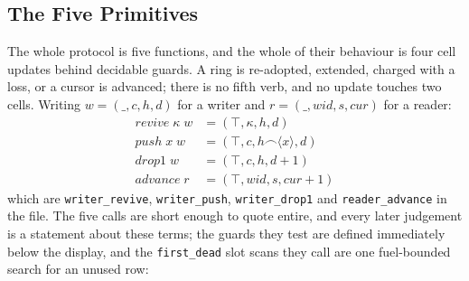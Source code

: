 \documentclass[10pt,journal,compsoc,twocolumn]{article}
\theoremstyle{definition}
\theoremstyle{remark}
\theoremstyle{plain}
\newcommand{\ctr}[1]{\texttt{#1}}
\begin{document}
\subsection{The Five Primitives}
\label{sec:primitives}
The whole protocol is five functions, and the whole of their behaviour is four
cell updates behind decidable guards. A ring is re-adopted, extended, charged
with a loss, or a cursor is advanced; there is no fifth verb, and no update
touches two cells. Writing \(w=(\_,c,h,d)\) for a writer and
\(r=(\_,\mathit{wid},s,\mathit{cur})\) for a reader:
\begin{equation}
\label{eq:updates}
\begin{aligned}
\mathit{revive}\;\kappa\;w &= (\top,\kappa,h,d)\\
\mathit{push}\;x\;w &= (\top,c,h\frown\langle x\rangle,d)\\
\mathit{drop1}\;w &= (\top,c,h,d+1)\\
\mathit{advance}\;r &= (\top,\mathit{wid},s,\mathit{cur}+1)
\end{aligned}
\end{equation}
which are \ctr{writer\_revive}, \ctr{writer\_push}, \ctr{writer\_drop1} and
\ctr{reader\_advance} in the file. The five calls are short enough to quote
entire, and every later judgement is a statement about these terms; the guards
they test are defined immediately below the display, and the \ctr{first\_dead}
slot scans they call are one fuel-bounded search for an unused row:
\end{document}
